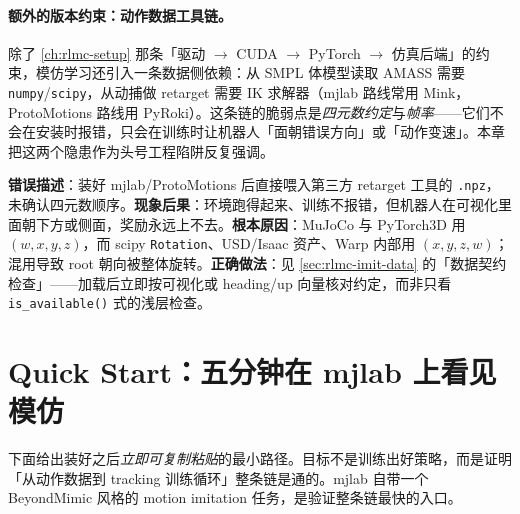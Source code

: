 \paragraph{额外的版本约束：动作数据工具链。}除了 \cref{ch:rlmc-setup} 那条「驱动 $\to$ CUDA $\to$ PyTorch $\to$ 仿真后端」的约束，模仿学习还引入一条数据侧依赖：从 SMPL 体模型读取 AMASS 需要 \verb|numpy|/\verb|scipy|，从动捕做 retarget 需要 IK 求解器（mjlab 路线常用 Mink，ProtoMotions 路线用 PyRoki）。这条链的脆弱点是\emph{四元数约定}与\emph{帧率}——它们不会在安装时报错，只会在训练时让机器人「面朝错误方向」或「动作变速」。本章把这两个隐患作为头号工程陷阱反复强调。

\begin{pitfall}
\textbf{错误描述}：装好 mjlab/ProtoMotions 后直接喂入第三方 retarget 工具的 \texttt{.npz}，未确认四元数顺序。\textbf{现象后果}：环境跑得起来、训练不报错，但机器人在可视化里面朝下方或侧面，奖励永远上不去。\textbf{根本原因}：MuJoCo 与 PyTorch3D 用 $(w,x,y,z)$，而 scipy \texttt{Rotation}、USD/Isaac 资产、Warp 内部用 $(x,y,z,w)$；混用导致 root 朝向被整体旋转。\textbf{正确做法}：见 \cref{sec:rlmc-imit-data} 的「数据契约检查」——加载后立即按可视化或 heading/up 向量核对约定，而非只看 \verb|is_available()| 式的浅层检查。
\end{pitfall}

\section*{Quick Start：五分钟在 mjlab 上看见模仿}
\label{sec:rlmc-imit-quickstart}

下面给出装好之后\emph{立即可复制粘贴}的最小路径。目标不是训练出好策略，而是证明「从动作数据到 tracking 训练循环」整条链是通的。mjlab 自带一个 BeyondMimic 风格的 motion imitation 任务，是验证整条链最快的入口。


